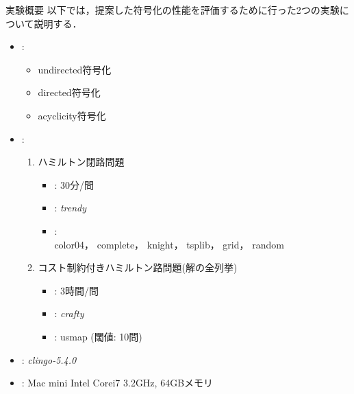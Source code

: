 \documentclass[dvipdfmx,11pt]{beamer}
\begin{document}
\begin{frame}{実験概要}
  以下では，提案した符号化の性能を評価するために行った2つの実験について説明する．
  \begin{itemize}
  \item {}:
    \begin{itemize}
    \item \textsf{undirected}符号化
    \item \textsf{directed}符号化
    \item \textsf{acyclicity}符号化
    \end{itemize}
  \item {}:
    \begin{enumerate}
    \item ハミルトン閉路問題
      \begin{itemize}
      \item {}: 30分/問
      \item {}: \textit{trendy}
      \item {}:\\
        \textsf{color04}，
        \textsf{complete}，
        \textsf{knight}，
        \textsf{tsplib}，
        \textsf{grid}，
        \textsf{random}
      \end{itemize}
    \item コスト制約付きハミルトン路問題(解の全列挙)
      \begin{itemize}
      \item {}: 3時間/問
      \item {}: \textit{crafty}
      \item {}: \textsf{usmap} (閾値: 10問)
      \end{itemize}
    \end{enumerate}
  \item {}: \textit{clingo-5.4.0}
  \item {}: Mac mini Intel Corei7 3.2GHz, 64GBメモリ
  \end{itemize}
\end{frame}
\end{document}
